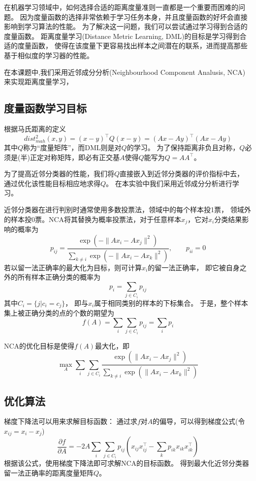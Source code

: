 \documentclass[a4paper,UTF8]{article}
\theoremstyle{definition}
\begin{document}
在机器学习领域中，如何选择合适的距离度量准则一直都是一个重要而困难的问题。
因为度量函数的选择非常依赖于学习任务本身，并且度量函数的好坏会直接影响到学习算法的性能。
为了解决这一问题，我们可以尝试通过学习得到合适的度量函数。
距离度量学习(Distance Metric Learning, DML)的目标是学习得到合适的度量函数，
使得在该度量下更容易找出样本之间潜在的联系，进而提高那些基于相似度的学习器的性能。

在本课题中,我们采用近邻成分分析(Neighbourhood Component Analusis, NCA)来实现距离度量学习，

\subsection*{度量函数学习目标}

根据马氏距离的定义
\[
	dist_{mah}^2(x, y) = (x - y)^\top Q(x - y) = (Ax - Ay)^\top (Ax - Ay)
\]
其中$Q$称为“度量矩阵”，而DML则是对$Q$的学习。
为了保持距离非负且对称，$Q$必须是(半)正定对称矩阵，即必有正交基$A$使得$Q$能写为$Q = AA^\top$。

为了提高近邻分类器的性能，我们将$Q$直接嵌入到近邻分类器的评价指标中去，
通过优化该性能目标相应地求得$Q$。
在本实验中我们采用近邻成分分析进行学习。

近邻分类器在进行判别时通常使用多数投票法，领域中的每个样本投1票，
领域外的样本投0票。NCA将其替换为概率投票法，对于任意样本$x_{j}$，它对$x_{i}$分类结果影响的概率为
\[
	p_{ij} = \frac{\exp(-\lVert Ax_{i} - Ax_{j} \rVert^2)}
	{\sum_{k \neq i} \exp(-\lVert Ax_{i} - Ax_{k} \rVert^2)}, \qquad
	p_{ii} = 0
\]
若以留一法正确率的最大化为目标，则可计算$x_{i}$的留一法正确率，
即它被自身之外的所有样本正确分类的概率为
\[
	p_{i} = \sum_{j \in C_{i}} p_{ij}
\]
其中$C_{i} = \lbrace j \vert c_{i} = c_{j} \rbrace$，
即与$x_{i}$属于相同类别的样本的下标集合。
于是，整个样本集上被正确分类的点的个数的期望为
\[
	f(A) = \sum_{i} \sum_{j \in C_{i}} p_{ij} = \sum_{i} p_{i}
\]

NCA的优化目标是使得$f(A)$最大化，即
\[
	\max_{A} \sum_{i} \sum_{j \in C_{i}}
	\frac{\exp(\lVert Ax_{i} - Ax_{j} \rVert^2)}
	{\sum_{k \neq i} \exp(\lVert Ax_{i} - Ax_{k} \rVert^2)}
\]

\subsection*{优化算法}

梯度下降法可以用来求解目标函数：
通过求$f$对$A$的偏导，可以得到梯度公式(令$x_{ij} = x_{i} - x_{j}$)
\[
	\frac{\partial f}{\partial A} =
	-2A \sum_{i} \sum_{j \in C_{i}}
	p_{ij}( x_{ij} x_{ij}^\top - \sum_{k} p_{ik} x_{ik} x_{ik}^\top)
\]
根据该公式，使用梯度下降法即可求解NCA的目标函数。
得到最大化近邻分类器留一法正确率的距离度量矩阵$Q$。
\end{document}

